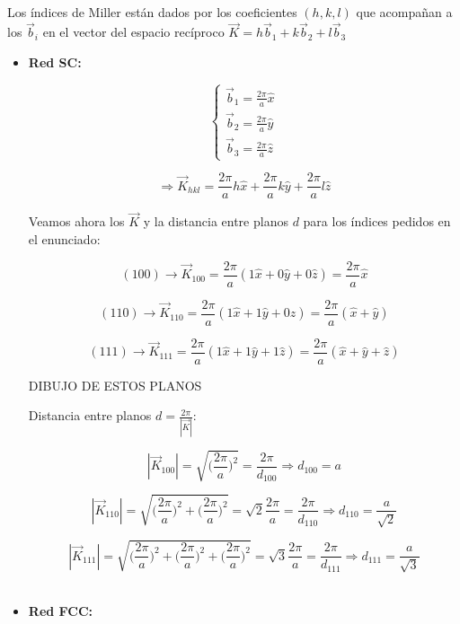 \documentclass[a4paper]{article}
\begin{document}
\subsection{}

Los \'indices de Miller est\'an dados por los coeficientes $(h, k, l)$ que acompa\~nan a los $\vec{b}_{i}$ en el vector del espacio rec\'iproco $\vec{K} = h\vec{b}_{1} + k\vec{b}_{2} + l\vec{b}_{3}$

\begin{itemize}
\item \textbf{Red SC:}

$$\begin{cases}
\vec{b}_{1} = \frac{2 \pi}{a}\hat{x}\\
\vec{b}_{2} = \frac{2 \pi}{a}\hat{y} \\
\vec{b}_{3} = \frac{2 \pi}{a}\hat{z}
\end{cases}$$

$$\Rightarrow \vec{K}_{hkl} = \frac{2 \pi}{a}h\hat{x} + \frac{2 \pi}{a}k\hat{y} + \frac{2 \pi}{a}l\hat{z}$$

Veamos ahora los $\vec{K}$ y la distancia entre planos $d$ para los \'indices pedidos en el enunciado:

$$(100) \rightarrow \vec{K}_{100} = \frac{2 \pi}{a}(1\hat{x} + 0\hat{y} + 0\hat{z}) = \frac{2 \pi}{a}\hat{x}$$

$$(110) \rightarrow \vec{K}_{110} = \frac{2 \pi}{a}(1\hat{x} + 1\hat{y} + 0\hat{z}) = \frac{2 \pi}{a}(\hat{x} + \hat{y})$$

$$(111) \rightarrow \vec{K}_{111} = \frac{2 \pi}{a}(1\hat{x} + 1\hat{y} + 1\hat{z}) = \frac{2 \pi}{a}(\hat{x} + \hat{y} + \hat{z})$$

DIBUJO DE ESTOS PLANOS

Distancia entre planos $d = \frac{2\pi}{|\vec{K}|}$:

$$| \vec{K}_{100} | = \sqrt{\bigg(\frac{2 \pi}{a}\bigg)^{2}} =  \frac{2\pi}{d_{100}} \Rightarrow d_{100} = a$$

$$| \vec{K}_{110} | = \sqrt{\bigg(\frac{2 \pi}{a}\bigg)^{2} + \bigg(\frac{2 \pi}{a}\bigg)^{2}} = \sqrt{2} \frac{2\pi}{a} =  \frac{2\pi}{d_{110}} \Rightarrow d_{110} = \frac{a}{\sqrt{2}}$$

$$| \vec{K}_{111} | = \sqrt{\bigg(\frac{2 \pi}{a}\bigg)^{2} + \bigg(\frac{2 \pi}{a}\bigg)^{2} + \bigg(\frac{2 \pi}{a}\bigg)^{2}} = \sqrt{3} \frac{2\pi}{a} =  \frac{2\pi}{d_{111}} \Rightarrow d_{111} = \frac{a}{\sqrt{3}}$$
\\

\item \textbf{Red FCC:}


\end{itemize}
\end{document}
